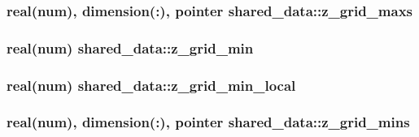 \subsubsection[{\texorpdfstring{z\+\_\+grid\+\_\+maxs}{z_grid_maxs}}]{\setlength{\rightskip}{0pt plus 5cm}real(num), dimension(\+:), pointer shared\+\_\+data\+::z\+\_\+grid\+\_\+maxs}\hypertarget{namespaceshared__data_a0e3e23f798e7e32d6ae0684ffa41a089}{}\label{namespaceshared__data_a0e3e23f798e7e32d6ae0684ffa41a089}
\subsubsection[{\texorpdfstring{z\+\_\+grid\+\_\+min}{z_grid_min}}]{\setlength{\rightskip}{0pt plus 5cm}real(num) shared\+\_\+data\+::z\+\_\+grid\+\_\+min}\hypertarget{namespaceshared__data_a16d11c0437372fc94fba8f696cc3435d}{}\label{namespaceshared__data_a16d11c0437372fc94fba8f696cc3435d}
\subsubsection[{\texorpdfstring{z\+\_\+grid\+\_\+min\+\_\+local}{z_grid_min_local}}]{\setlength{\rightskip}{0pt plus 5cm}real(num) shared\+\_\+data\+::z\+\_\+grid\+\_\+min\+\_\+local}\hypertarget{namespaceshared__data_a09f7e7f94540648ce5317cf34331f893}{}\label{namespaceshared__data_a09f7e7f94540648ce5317cf34331f893}
\subsubsection[{\texorpdfstring{z\+\_\+grid\+\_\+mins}{z_grid_mins}}]{\setlength{\rightskip}{0pt plus 5cm}real(num), dimension(\+:), pointer shared\+\_\+data\+::z\+\_\+grid\+\_\+mins}\hypertarget{namespaceshared__data_a7888fecc3fc8288475a70c8cec55313e}{}\label{namespaceshared__data_a7888fecc3fc8288475a70c8cec55313e}
